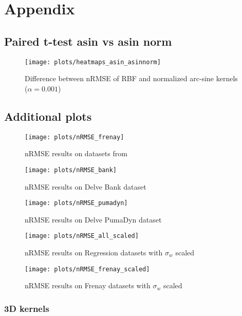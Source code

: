 \chapter{Appendix}

\section{Paired t-test asin vs asin norm}

\begin{figure}[H]
    \texttt{[image: plots/heatmaps\_asin\_asinnorm]}
    \caption{Difference between nRMSE of RBF and normalized arc-sine kernels ($\alpha=0.001$)}
    \label{fig:paired-ttest-asin-asinnorm-diff}
\end{figure}

\section{Additional plots}

\begin{figure}[H]
    \texttt{[image: plots/nRMSE\_frenay]}
    \caption{nRMSE results on datasets from \cite{frenayParameterinsensitiveKernelExtreme2011}}
\end{figure}

\begin{figure}[H]
    \texttt{[image: plots/nRMSE\_bank]}
    \caption{nRMSE results on Delve Bank dataset}
\end{figure}

\begin{figure}[H]
    \texttt{[image: plots/nRMSE\_pumadyn]}
    \caption{nRMSE results on Delve PumaDyn dataset}
\end{figure}

\begin{figure}[H]
    \texttt{[image: plots/nRMSE\_all\_scaled]}
    \caption{nRMSE results on Regression datasets with $\sigma_w$ scaled}
\end{figure}

\begin{figure}[H]
    \texttt{[image: plots/nRMSE\_frenay\_scaled]}
    \caption{nRMSE results on Frenay datasets with $\sigma_w$ scaled}
\end{figure}

\subsection{3D kernels}

